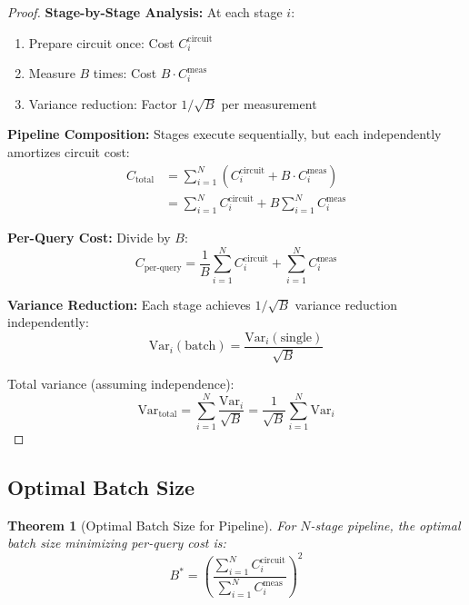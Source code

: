 \documentclass[11pt]{article}
\newtheorem{theorem}{Theorem}
\begin{document}
\begin{proof}
\textbf{Stage-by-Stage Analysis:} At each stage $i$:
\begin{enumerate}
\item Prepare circuit once: Cost $C_i^{\text{circuit}}$
\item Measure $B$ times: Cost $B \cdot C_i^{\text{meas}}$
\item Variance reduction: Factor $1/\sqrt{B}$ per measurement
\end{enumerate}

\textbf{Pipeline Composition:} Stages execute sequentially, but each independently amortizes circuit cost:
\begin{align}
C_{\text{total}} &= \sum_{i=1}^N (C_i^{\text{circuit}} + B \cdot C_i^{\text{meas}}) \\
&= \sum_{i=1}^N C_i^{\text{circuit}} + B \sum_{i=1}^N C_i^{\text{meas}}
\end{align}

\textbf{Per-Query Cost:} Divide by $B$:
\begin{equation}
C_{\text{per-query}} = \frac{1}{B}\sum_{i=1}^N C_i^{\text{circuit}} + \sum_{i=1}^N C_i^{\text{meas}}
\end{equation}

\textbf{Variance Reduction:} Each stage achieves $1/\sqrt{B}$ variance reduction independently:
\begin{equation}
\text{Var}_i(\text{batch}) = \frac{\text{Var}_i(\text{single})}{\sqrt{B}}
\end{equation}

Total variance (assuming independence):
\begin{equation}
\text{Var}_{\text{total}} = \sum_{i=1}^N \frac{\text{Var}_i}{\sqrt{B}} = \frac{1}{\sqrt{B}} \sum_{i=1}^N \text{Var}_i
\end{equation}
\end{proof}

\subsection{Optimal Batch Size}

\begin{theorem}[Optimal Batch Size for Pipeline]
For $N$-stage pipeline, the optimal batch size minimizing per-query cost is:
\begin{equation}
B^* = \left(\frac{\sum_{i=1}^N C_i^{\text{circuit}}}{\sum_{i=1}^N C_i^{\text{meas}}}\right)^2
\end{equation}
\end{theorem}
\end{document}
